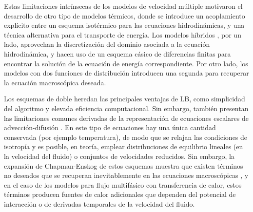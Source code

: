 Estas limitaciones intr\'insecas de los modelos de velocidad m\'ultiple motivaron el desarrollo de otro tipo de modelos t\'ermicos, donde se introduce un acoplamiento expl\'icito entre un esquema isot\'ermico para las ecuaciones hidrodin\'amicas, y una t\'ecnica alternativa para el transporte de energ\'ia. Los modelos h\'ibridos \cite{dong_numerical_2012,li_lattice_2015}, por un lado, aprovechan la discretizaci\'on del dominio asociada a la ecuaci\'on hidrodin\'amica, y hacen uso de un esquema c\'asico de diferencias finitas para encontrar la soluci\'on de la ecuaci\'on de energ\'ia correspondiente. Por otro lado, los modelos con dos funciones de distribuci\'on introducen una segunda \lbe{} para recuperar la ecuaci\'on macrosc\'opica deseada.

Los esquemas de doble \fdp{} heredan las principales ventajas de LB, como simplicidad del algoritmo y elevada eficiencia computacional. Sin embargo, tambi\'en presentan las limitaciones comunes derivadas de la representaci\'on de ecuaciones escalares de advecci\'on-difusi\'on \cite{markus_simulation_2011, huang_modified_2014, li_improved_2017, huang_numerical_2011, li_effect_2014, huang_multiphase_2015}. En este tipo de ecuaciones hay una \'unica cantidad conservada (por ejemplo temperatura), de modo que se relajan las condiciones de isotrop\'ia y es posible, en teor\'ia, emplear distribuciones de equilibrio lineales (en la velocidad del fluido) o conjuntos de velocidades reducidos. Sin embargo, la expansi\'on de Chapman-Enskog de estos esquemas muestra que existen t\'erminos no deseados que se recuperan inevitablemente en las ecuaciones macrosc\'opicas \cite{kruger_lattice_2017, huang_modified_2014, huang_numerical_2011}, y en el caso de los modelos para flujo multif\'asico con transferencia de calor, estos t\'erminos producen fuentes de calor adicionales que dependen del potencial de interacci\'on o de derivadas temporales de la velocidad del fluido.

